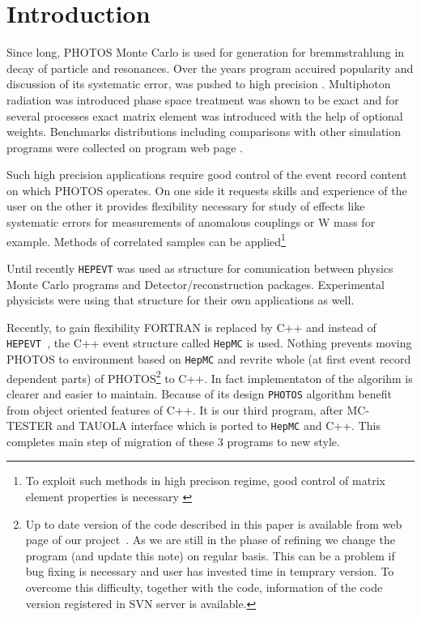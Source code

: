 \documentclass[]{Photos_interface_design}
\begin{document}
\maketitle

\tableofcontents{}

\newpage

\section{Introduction}
Since long, PHOTOS Monte Carlo \cite{Barberio:1990ms,Barberio:1993qi} is used for generation for bremmstrahlung in decay of particle and resonances. Over the years program accuired
popularity and discussion of its systematic error, was pushed to high 
precision \cite{Golonka:2006tw}. Multiphoton radiation was introduced \cite{Golonka:2005pn} phase space treatment was shown to be exact \cite{Nanava:2006vv} and for several processes \cite{Golonka:2006tw,Nanava:2006vv,Nanava:2009vg}
exact matrix element was introduced with the help of optional weights.
Benchmarks distributions including comparisons with  
other simulation programs were collected on program web page \cite{Photos_tests}. 

 Such high precision applications require good control of the event record content on which PHOTOS operates. On one side it 
requests skills and experience of the user on the other it provides 
flexibility necessary for study of effects like systematic errors for 
measurements of anomalous couplings or W mass for example. Methods of 
correlated samples  can be applied\footnote{To exploit such methods in 
high precison regime, good control of matrix element properties is necessary
\cite{Kleiss:1990jv}} 

Until recently {\tt HEPEVT} was used as structure for 
comunication between physics Monte Carlo programs and Detector/reconstruction 
packages. Experimental physicists were using that structure 
for their own applications  as well.

Recently, to gain  flexibility FORTRAN is  replaced by C++ and 
instead of {\tt HEPEVT }, the  C++ event structure called {\tt HepMC}  \cite{Dobbs:2001ck}
is used. Nothing prevents 
moving PHOTOS to environment based on  {\tt HepMC}
 and revrite whole (at first event record dependent parts) 
of PHOTOS\footnote{Up to date version of the code described in this paper is
available from web page of our project~\cite{photosC++}. 
As we are still in the phase of refining
we change the program (and update this note) on regular basis. 
This can be a problem if bug fixing is necessary and user has invested time 
in temprary version. To overcome this difficulty, 
together with the code, information of the code version registered in 
SVN server is available.  }
 to C++. In fact implementaton of the algorihm is clearer and easier to
 maintain. Because of its design {\tt PHOTOS} algorithm benefit from object 
oriented features of C++. It is our third program, after MC-TESTER \cite{Davidson:2008ma}
and TAUOLA interface \cite{Davidson:2010rw} which is ported to {\tt HepMC} and C++.
This completes main step of migration of these 3 programs to new style.
\end{document}
